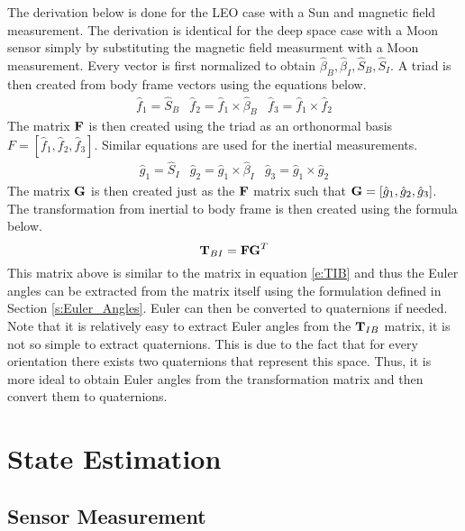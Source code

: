 \documentclass{article}
\begin{document}
The derivation below is done for the LEO case with a Sun and magnetic
field measurement. The derivation is identical for the deep space case
with a Moon sensor simply by substituting the magnetic field
measurment with a Moon measurement. Every vector is first normalized to obtain
$\hat{\beta}_B,\hat{\beta}_I,\hat{S}_B,\hat{S}_I$. A triad is then created
from body frame vectors using the equations below.
\begin{equation}
  \begin{matrix} \hat{f}_1 = \hat{S}_B & \hat{f}_2 = \hat{f}_1 \times
    \hat{\beta}_B & \hat{f}_3 = \hat{f}_1 \times \hat{f}_2 \end{matrix}
\end{equation}
The matrix ${\bf F}$ is then created using the triad as an orthonormal basis
$F = [\hat{f}_1,\hat{f}_2,\hat{f}_3]$. Similar equations are used for
the inertial measurements. 
\begin{equation}
  \begin{matrix} \hat{g}_1 = \hat{S}_I & \hat{g}_2 = \hat{g}_1 \times
    \hat{\beta}_I & \hat{g}_3 = \hat{g}_1 \times \hat{g}_2 \end{matrix}
\end{equation}
The matrix ${\bf G}$ is then created just as the ${\bf F}$ matrix such
that ${\bf G} =
[\hat{g}_1,\hat{g}_2,\hat{g}_3]$. The transformation from inertial to
body frame is then created using the formula below.
\begin{equation}
  {\bf T}_{BI} = {\bf FG}^T
\end{equation}
This matrix above is similar to the matrix in equation \ref{e:TIB} and
thus the Euler angles can be extracted from the matrix itself using
the formulation defined in Section \ref{s:Euler_Angles}. Euler can
then be converted to quaternions if needed. Note that it is relatively
easy to extract Euler angles from the ${\bf T}_{IB}$ matrix, it is not so
simple to extract quaternions. This is due to the fact that for every
orientation there exists two quaternions that represent this
space. Thus, it is more ideal to obtain Euler angles from the
transformation matrix and then convert them to quaternions.

\section{State Estimation}

\subsection{Sensor Measurement} \label{s:measurements}
\end{document}
